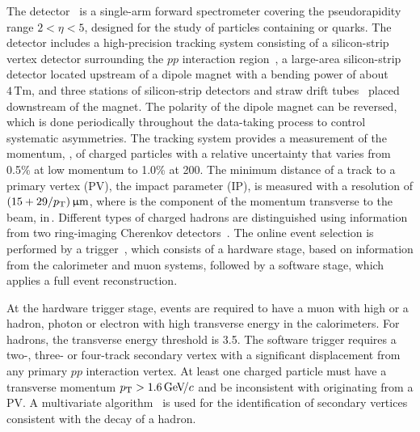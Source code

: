 The \lhcb detector~\cite{Alves:2008zz,LHCb-DP-2014-002} is a single-arm forward
spectrometer covering the \mbox{pseudorapidity} range $2<\eta <5$,
designed for the study of particles containing \bquark or \cquark
quarks. The detector includes a high-precision tracking system
consisting of a silicon-strip vertex detector surrounding the $pp$
interaction region~\cite{LHCb-DP-2014-001}, a large-area silicon-strip detector located
upstream of a dipole magnet with a bending power of about
$4{\mathrm{\,Tm}}$, and three stations of silicon-strip detectors and straw
drift tubes~\cite{LHCb-DP-2013-003,LHCb-DP-2017-001} placed downstream of the magnet.
The polarity of the dipole magnet can be reversed, which is done periodically throughout the data-taking process to control systematic asymmetries.
The tracking system provides a measurement of the momentum, \ptot, of charged particles with
a relative uncertainty that varies from 0.5\% at low momentum to 1.0\% at 200\gevc.
The minimum distance of a track to a primary vertex (PV), the impact parameter (IP), 
is measured with a resolution of $(15+29/p_{\mathrm{T}})\,\upmu\text{m}$,
where \pt is the component of the momentum transverse to the beam, in\,\gevc.
Different types of charged hadrons are distinguished using information
from two ring-imaging Cherenkov detectors~\cite{LHCb-DP-2012-003}. 
The online event selection is performed by a trigger~\cite{LHCb-DP-2012-004}, 
which consists of a hardware stage, based on information from the calorimeter and muon
systems, followed by a software stage, which applies a full event
reconstruction.


At the hardware trigger stage, events are required to have a muon with high \pt or a
hadron, photon or electron with high transverse energy in the calorimeters. For hadrons,
the transverse energy threshold is 3.5\gev.
The software trigger requires a two-, three- or four-track
secondary vertex with a significant displacement from any primary
$pp$ interaction vertex. At least one charged particle
must have a transverse momentum $p_{\mathrm{T}} > 1.6\text{\,Ge\kern -0.1em V\!/}c$ and be
inconsistent with originating from a PV.
A multivariate algorithm~\cite{BBDT} is used for
the identification of secondary vertices consistent with the decay
of a \bquark hadron.

